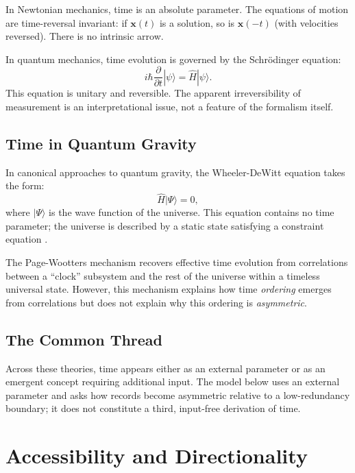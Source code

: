 \documentclass[12pt,a4paper,openany]{book}
\begin{document}
In Newtonian mechanics, time is an absolute parameter. The equations of motion are time-reversal invariant: if $\mathbf{x}(t)$ is a solution, so is $\mathbf{x}(-t)$ (with velocities reversed). There is no intrinsic arrow.

In quantum mechanics, time evolution is governed by the Schr\"odinger equation:
\begin{equation}
i\hbar \frac{\partial}{\partial t} |\psi\rangle = \hat{H} |\psi\rangle.
\end{equation}
This equation is unitary and reversible. The apparent irreversibility of measurement is an interpretational issue, not a feature of the formalism itself.

\subsection{Time in Quantum Gravity}

In canonical approaches to quantum gravity, the Wheeler-DeWitt equation takes the form:
\begin{equation}
\hat{H} |\Psi\rangle = 0,
\end{equation}
where $|\Psi\rangle$ is the wave function of the universe. This equation contains no time parameter; the universe is described by a static state satisfying a constraint equation \cite{DeWitt1967}.

The Page-Wootters mechanism \cite{PageWootters1983} recovers effective time evolution from correlations between a ``clock'' subsystem and the rest of the universe within a timeless universal state. However, this mechanism explains how time \emph{ordering} emerges from correlations but does not explain why this ordering is \emph{asymmetric}.

\subsection{The Common Thread}

Across these theories, time appears either as an external parameter or as an emergent concept requiring additional input.  The model below uses an external parameter and asks how records become asymmetric relative to a low-redundancy boundary; it does not constitute a third, input-free derivation of time.

\section{Accessibility and Directionality}
\label{F-sec:accessibility}
\end{document}
